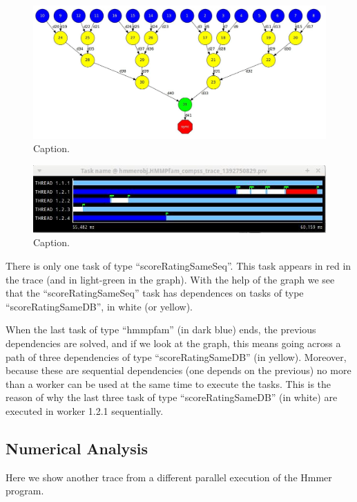 \begin{figure}[ht!]
  \centering
    \includegraphics[width=1.0\textwidth]{./Sections/5_Analysis/Figures/9.jpeg}
    \caption{Caption.}
\end{figure}

\begin{figure}[ht!]
  \centering
    \includegraphics[width=1.0\textwidth]{./Sections/5_Analysis/Figures/10.jpeg}
    \caption{Caption.}
\end{figure}

There is only one task of type ``scoreRatingSameSeq''. This task appears in red in the trace 
(and in light-green in the graph). With the help of the graph we see that the ``scoreRatingSameSeq'' 
task has dependences on tasks of type ``scoreRatingSameDB'', in white (or yellow).

When the last task of type ``hmmpfam'' (in dark blue) ends, the previous dependencies are solved, 
and if we look at the graph, this means going across a path of three dependencies of type 
``scoreRatingSameDB'' (in yellow). Moreover, because these are sequential dependencies (one depends 
on the previous) no more than a worker can be used at the same time to execute the tasks. 
This is the reason of why the last three task of type ``scoreRatingSameDB'' (in white) are 
executed in worker 1.2.1 sequentially.

\subsection{Numerical Analysis}
Here we show another trace from a different parallel execution of the Hmmer program.
 
